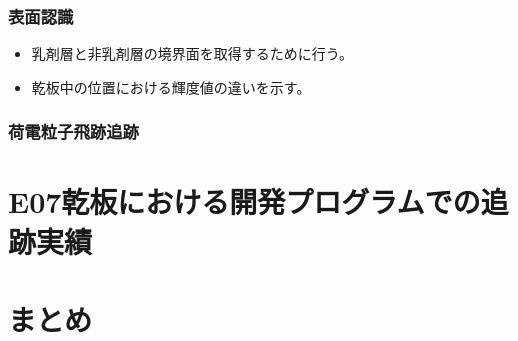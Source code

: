 \documentclass[12pt,a4paper]{jarticle}
\begin{document}
\subsubsection{表面認識}
\begin{itemize}
    \item 乳剤層と非乳剤層の境界面を取得するために行う。
    \item 乾板中の位置における輝度値の違いを示す。
\end{itemize}
\subsubsection{荷電粒子飛跡追跡}

\newpage
\section{E07乾板における開発プログラムでの追跡実績}

\newpage
\section{まとめ}
\end{document}
